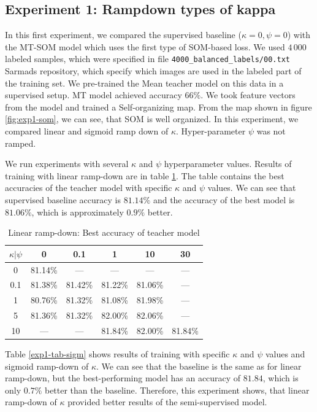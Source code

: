 \subsection{Experiment 1: Rampdown types of kappa}
\label{exp1}
In this first experiment, we compared the supervised baseline ($\kappa=0, \psi=0$) with the MT-SOM model which uses the first type of SOM-based loss. We used $4\,000$ labeled samples, which were specified in file \texttt{4000\_balanced\_labels/00.txt} Sarmads repository, which specify which images are used in the labeled part of the training set. We pre-trained the Mean teacher model on this data in a supervised setup. MT model achieved accuracy $66\%$. We took feature vectors from the model and trained a Self-organizing map. From the map shown in figure \ref{fig:exp1-som}, we can see, that SOM is well organized. In this experiment, we compared linear and sigmoid ramp down of $\kappa$. Hyper-parameter $\psi$ was not ramped. 

We run experiments with several $\kappa$ and $\psi$ hyperparameter values. Results of training with linear ramp-down are in table \ref{exp1-tab}. The table contains the best accuracies of the teacher model with specific $\kappa$ and $\psi$ values. We can see that supervised baseline accuracy is $81.14\%$ and the accuracy of the best model is $81.06\%$, which is approximately $0.9\%$ better. 


\begin{table}[h!]
\centering
\begin{tabular}{|c|c|c|c|c|c|}
\hline
$\kappa | \psi$ & 0       & 0.1     & 1       & 10      & 30      \\ \hline
0           & 81.14\% & ---     & ---     & ---     & ---     \\ \hline
0.1         & 81.38\% & 81.42\% & 81.22\% & 81.06\% & ---     \\ \hline
1           & 80.76\% & 81.32\% & 81.08\% & 81.98\% & ---     \\ \hline
5           & 81.36\% & 81.32\% & \color{purple}  82.00\% & \color{purple} 82.06\% & ---     \\ \hline
10          & ---     & ---     & 81.84\% & \color{purple}  82.00\% & 81.84\% \\ \hline
\end{tabular}
\caption{Linear ramp-down: Best accuracy of teacher model}
\label{exp1-tab}
\end{table}

Table \ref{exp1-tab-sigm} shows results of training with specific $\kappa$ and $\psi$ values and sigmoid ramp-down of $\kappa$. We can see that the baseline is the same as for linear ramp-down, but the best-performing model has an accuracy of $81.84$, which is only $0.7\%$ better than the baseline. Therefore, this experiment shows, that linear ramp-down of $\kappa$ provided better results of the semi-supervised model.



